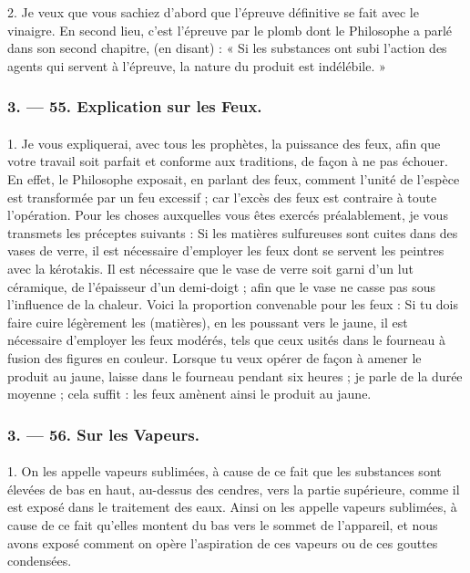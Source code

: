 \documentclass[a4paper, 11pt, oneside, polutonikogreek, french]{article}
\begin{document}
2. Je veux que vous sachiez d'abord que l'épreuve définitive se fait avec le vinaigre. En second lieu, c'est l'épreuve par le plomb dont le Philosophe a parlé dans son second chapitre, (en disant) : « Si les substances ont subi l'action des agents qui servent à l'épreuve, la nature du produit est indélébile. »

\bigskip
\centerline{\EightStarTaper}
\centerline{\EightStarTaper\EightStarTaper}
\bigskip

\subsubsection{3. --- 55. Explication sur les Feux.}
\paragraph{}
1. Je vous expliquerai, avec tous les prophètes, la puissance des feux, afin que votre travail soit parfait et conforme aux traditions, de façon à ne pas échouer. En effet, le Philosophe exposait, en parlant des feux, comment l'unité de l'espèce est transformée par un feu excessif ; car l'excès des feux est contraire à toute l'opération. Pour les choses auxquelles vous êtes exercés préalablement, je vous transmets les préceptes suivants : Si les matières sulfureuses sont cuites dans des vases de verre, il est nécessaire d'employer les feux dont se servent les peintres avec la kérotakis. Il est nécessaire que le vase de verre soit garni d'un lut céramique, de l'épaisseur d'un demi-doigt ; afin que le vase ne casse pas sous l'influence de la chaleur. Voici la proportion convenable pour les feux : Si tu dois faire cuire légèrement les (matières), en les poussant vers le jaune, il est nécessaire d'employer les feux modérés, tels que ceux usités dans le fourneau à fusion des figures en couleur. Lorsque tu veux opérer de façon à amener le produit au jaune, laisse dans le fourneau pendant six heures ; je parle de la durée moyenne ; cela suffit : les feux amènent ainsi le produit au jaune.

\bigskip
\centerline{\EightStarTaper}
\centerline{\EightStarTaper\EightStarTaper}
\bigskip

\subsubsection{3. --- 56. Sur les Vapeurs.}
\paragraph{}
1. On les appelle vapeurs sublimées, à cause de ce fait que les substances sont élevées de bas en haut, au-dessus des cendres, vers la partie supérieure, comme il est exposé dans le traitement des eaux. Ainsi on les appelle vapeurs sublimées, à cause de ce fait qu'elles montent du bas vers le sommet de l'appareil, et nous avons exposé comment on opère l'aspiration de ces vapeurs ou de ces gouttes condensées.
\end{document}

